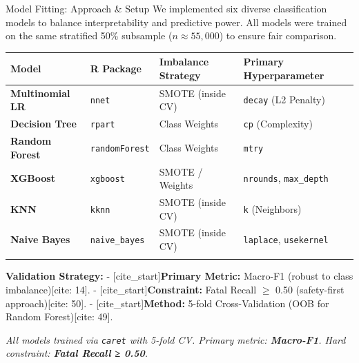 \documentclass[
  ignorenonframetext,
]{beamer}
\begin{document}
\begin{frame}[fragile]{Model Fitting: Approach \& Setup}
\label{model-fitting-approach-setup}
We implemented six diverse classification models to balance
interpretability and predictive power. All models were trained on the
same stratified 50\% subsample (\(n \approx 55,000\)) to ensure fair
comparison.

\begin{longtable}[]{@{}
  >{\raggedright\arraybackslash}p{}
  >{\raggedright\arraybackslash}p{}
  >{\raggedright\arraybackslash}p{}
  >{\raggedright\arraybackslash}p{}@{}}
\toprule\noalign{}
\begin{minipage}[b]{\linewidth}\raggedright
Model
\end{minipage} & \begin{minipage}[b]{\linewidth}\raggedright
R Package
\end{minipage} & \begin{minipage}[b]{\linewidth}\raggedright
Imbalance Strategy
\end{minipage} & \begin{minipage}[b]{\linewidth}\raggedright
Primary Hyperparameter
\end{minipage} \\
\midrule\noalign{}
\endhead
\textbf{Multinomial LR} & \texttt{nnet} & SMOTE (inside CV) &
\texttt{decay} (L2 Penalty) \\
\textbf{Decision Tree} & \texttt{rpart} & Class Weights & \texttt{cp}
(Complexity) \\
\textbf{Random Forest} & \texttt{randomForest} & Class Weights &
\texttt{mtry} \\
\textbf{XGBoost} & \texttt{xgboost} & SMOTE / Weights &
\texttt{nrounds}, \texttt{max\_depth} \\
\textbf{KNN} & \texttt{kknn} & SMOTE (inside CV) & \texttt{k}
(Neighbors) \\
\textbf{Naive Bayes} & \texttt{naive\_bayes} & SMOTE (inside CV) &
\texttt{laplace}, \texttt{usekernel} \\
\bottomrule\noalign{}
\end{longtable}

\textbf{Validation Strategy:} - {[}cite\_start{]}\textbf{Primary
Metric:} Macro-F1 (robust to class imbalance){[}cite: 14{]}. -
{[}cite\_start{]}\textbf{Constraint:} Fatal Recall \(\geq\) 0.50
(safety-first approach){[}cite: 50{]}. -
{[}cite\_start{]}\textbf{Method:} 5-fold Cross-Validation (OOB for
Random Forest){[}cite: 49{]}.

\emph{All models trained via \texttt{caret} with 5-fold CV. Primary
metric: \textbf{Macro-F1}. Hard constraint: \textbf{Fatal Recall ≥
0.50}.}
\end{frame}
\end{document}
